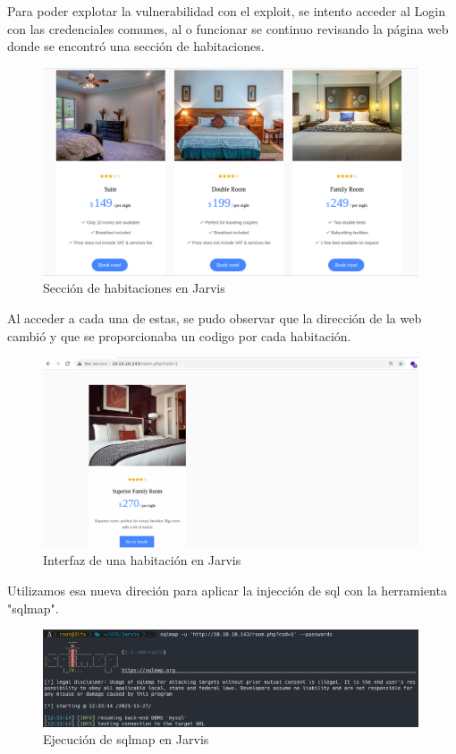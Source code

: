         \large{Para poder explotar la vulnerabilidad con el exploit, se intento acceder al Login con las credenciales comunes, al o funcionar se continuo revisando la página web donde se encontró una sección de habitaciones.}
        \par
        \begin{figure}[H]
            \centering
            \includegraphics[width=0.99\textwidth]{imagenes/jarvis/06_seccion_rooms_jarvis.png}
            \caption{Sección de habitaciones en Jarvis}
        \end{figure}

        \large{Al acceder a cada una de estas, se pudo observar que la dirección de la web cambió y que se proporcionaba un codigo por cada habitación.}
        \par
        \begin{figure}[H]
            \centering
            \includegraphics[width=0.99\textwidth]{imagenes/jarvis/07_room_jarvis.png}
            \caption{Interfaz de una habitación en Jarvis}
        \end{figure}

        \large{Utilizamos esa nueva direción para aplicar la injección de sql con la herramienta "sqlmap".}
        \par
        \begin{figure}[H]
            \centering
            \includegraphics[width=0.99\textwidth]{imagenes/jarvis/08_sql_map_jarvis.png}
            \caption{Ejecución de sqlmap en Jarvis}
        \end{figure}


